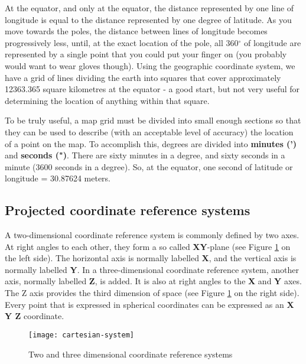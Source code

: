 At the equator, and only at the equator, the distance represented by one line
of longitude is equal to the distance represented by one degree of latitude.
As you move towards the poles, the distance between lines of longitude
becomes progressively less, until, at the exact location of the pole, all
360$^\circ$ of longitude are represented by a single point that you could put your
finger on (you probably would want to wear gloves though). Using the
geographic coordinate system, we have a grid of lines dividing the earth into
squares that cover approximately 12363.365 square kilometres at the equator -
a good start, but not very useful for determining the location of anything
within that square.

To be truly useful, a map grid must be divided into small enough sections so
that they can be used to describe (with an acceptable level of accuracy) the
location of a point on the map. To accomplish this, degrees are divided into
\textbf{minutes (')} and \textbf{seconds (")}. There are sixty minutes in a
degree, and sixty
seconds in a minute (3600 seconds in a degree). So, at the equator, one
second of latitude or longitude = 30.87624 meters.

\subsection{Projected coordinate reference systems}

A two-dimensional coordinate reference system is commonly defined by two
axes. At right angles to each other, they form a so called \textbf{XY}-plane
(see Figure \ref{fig:crsaxes} on the left side). The horizontal axis is normally
labelled \textbf{X}, and the vertical axis is normally labelled \textbf{Y}.
In a three-dimensional coordinate reference system, another axis, normally
labelled \textbf{Z}, is added. It
is also at right angles to the \textbf{X} and \textbf{Y} axes. The Z axis
provides the third
dimension of space (see Figure \ref{fig:crsaxes} on the right side).  Every
point that
is expressed in spherical coordinates can be expressed as an \textbf{X Y Z}
coordinate. 

\begin{figure}[ht]
   \begin{center}
   \caption{Two and three dimensional coordinate reference systems}
\label{fig:crsaxes}\smallskip
   \texttt{[image: cartesian-system]}
\end{center}
\end{figure}


